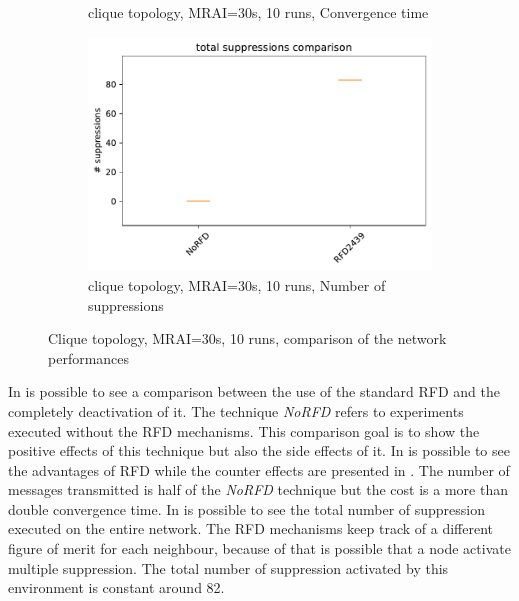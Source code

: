 \begin{figure}[h]
\begin{subfigure}[b]{0.49\textwidth}
         \caption{clique topology, MRAI=30s, 10 runs, Convergence time}
         \label{fig:RFD_2439_clique_MRAI30_convTime}
     \end{subfigure}
     \hfill
     \begin{subfigure}[b]{0.49\textwidth}
         \centering
         \includegraphics[width=\textwidth]{images/RFD/clique/clique_rfd_comparison_2439_suppressions_boxplot.pdf}
         \caption{clique topology, MRAI=30s, 10 runs, Number of suppressions}
         \label{fig:RFD_2439_clique_MRAI30_suppressions}
     \end{subfigure}
        \caption{Clique topology, MRAI=30s, 10 runs, comparison of the network performances}
        \label{fig:RFD_2439_MRAI30}
\end{figure}

In  is possible to see a comparison between the use
of the standard \ac{RFD} and the completely deactivation of it.
The technique \textit{NoRFD} refers to experiments executed without the
\ac{RFD} mechanisms.
This comparison goal is to show the positive effects of this technique but also
the side effects of it.
In  is possible to see the advantages
of \ac{RFD} while the counter effects are presented in .
The number of messages transmitted is half of the \textit{NoRFD} technique but
the cost is a more than double convergence time.
In  is possible to see the total
number of suppression executed on the entire network.
The \ac{RFD} mechanisms keep track of a different figure of merit for each neighbour,
because of that is possible that a node activate multiple suppression.
The total number of suppression activated by this environment is constant around
\num{82}.

